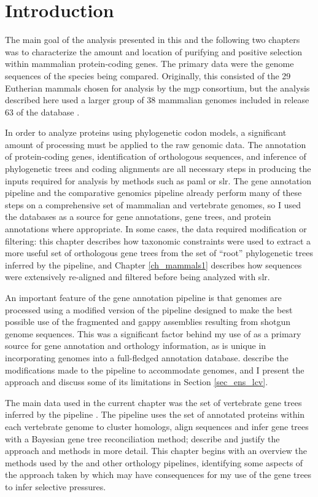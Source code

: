 \section{Introduction}

The main goal of the analysis presented in this and the following two
chapters was to characterize the amount and location of purifying and
positive selection within mammalian protein-coding genes. The primary
data were the genome sequences of the species being
compared. Originally, this consisted of the 29 Eutherian mammals
chosen for analysis by the \ac{mgp} consortium, but the analysis
described here used a larger group of 38 mammalian genomes included in
release 63 of the \ens database \citep{Flicek2011}.

In order to analyze proteins using phylogenetic codon models, a
significant amount of processing must be applied to the raw genomic
data. The annotation of protein-coding genes, identification of
orthologous sequences, and inference of phylogenetic trees and coding
alignments are all necessary steps in producing the inputs required
for analysis by methods such as \acs{paml} or \acs{slr}. The \ens gene
annotation pipeline and the \ens \cmp comparative genomics pipeline
already perform many of these steps on a comprehensive set of
mammalian and vertebrate genomes, so I used the \ens databases as a
source for gene annotations, gene trees, and protein annotations where
appropriate. In some cases, the \ens data required modification or
filtering: this chapter describes how taxonomic constraints were used
to extract a more useful set of orthologous gene trees from the set of
``root'' phylogenetic trees inferred by the \cmp pipeline, and Chapter
\ref{ch_mammals1} describes how sequences were extensively re-aligned
and filtered before being analyzed with \ac{slr}.

An important feature of the \ens gene annotation pipeline is that \lcv
genomes are processed using a modified version of the pipeline
designed to make the best possible use of the fragmented and gappy
assemblies resulting from \lcv shotgun genome sequences. This was a
significant factor behind my use of \ens as a primary source for gene
annotation and orthology information, as \ens is unique in
incorporating \lcv genomes into a full-fledged annotation
database. \citet{Hubbard2007} describe the modifications made to the
\ens pipeline to accommodate \lcv genomes, and I present the approach
and discuss some of its limitations in Section \ref{sec_ens_lcv}.

The main data used in the current chapter was the set of vertebrate
gene trees inferred by the \ens \cmp pipeline \citep{Vilella2009}. The
\cmp pipeline uses the set of annotated proteins within each
vertebrate genome to cluster homologs, align sequences and infer gene
trees with a Bayesian gene tree reconciliation method;
\citet{Vilella2009} describe and justify the approach and methods in
more detail. This chapter begins with an overview the methods used by
the \cmp and other orthology pipelines, identifying some aspects of
the approach taken by \cmp which may have consequences for my use of
the gene trees to infer \sw selective pressures.

